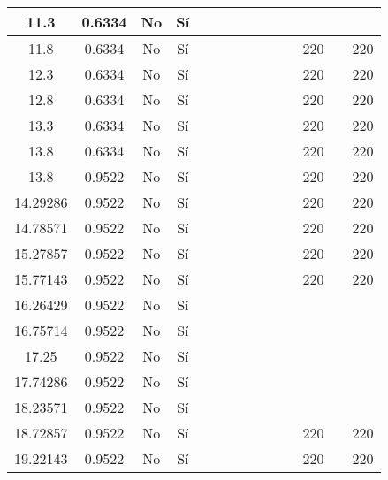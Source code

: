 \begin{table}[H]
{\begin{tabular}{|c|c|c|c|c|c|c|c|c|c|c|c|c|c|}
11.3 & 0.6334 & No  & Sí  &     &     &     &     &     &     &     &     &     &  \bigstrut\\
\hline
11.8 & 0.6334 & No  & Sí  &     &     &     &     &     &     &     & 220 &     & 220 \bigstrut\\
\hline
12.3 & 0.6334 & No  & Sí  &     &     &     &     &     &     &     & 220 &     & 220 \bigstrut\\
\hline
12.8 & 0.6334 & No  & Sí  &     &     &     &     &     &     &     & 220 &     & 220 \bigstrut\\
\hline
13.3 & 0.6334 & No  & Sí  &     &     &     &     &     &     &     & 220 &     & 220 \bigstrut\\
\hline
13.8 & 0.6334 & No  & Sí  &     &     &     &     &     &     &     & 220 &     & 220 \bigstrut\\
\hline
13.8 & 0.9522 & No  & Sí  &     &     &     &     &     &     &     & 220 &     & 220 \bigstrut\\
\hline
14.29286 & 0.9522 & No  & Sí  &     &     &     &     &     &     &     & 220 &     & 220 \bigstrut\\
\hline
14.78571 & 0.9522 & No  & Sí  &     &     &     &     &     &     &     & 220 &     & 220 \bigstrut\\
\hline
15.27857 & 0.9522 & No  & Sí  &     &     &     &     &     &     &     & 220 &     & 220 \bigstrut\\
\hline
15.77143 & 0.9522 & No  & Sí  &     &     &     &     &     &     &     & 220 &     & 220 \bigstrut\\
\hline
16.26429 & 0.9522 & No  & Sí  &     &     &     &     &     &     &     &     &     &  \bigstrut\\
\hline
16.75714 & 0.9522 & No  & Sí  &     &     &     &     &     &     &     &     &     &  \bigstrut\\
\hline
17.25 & 0.9522 & No  & Sí  &     &     &     &     &     &     &     &     &     &  \bigstrut\\
\hline
17.74286 & 0.9522 & No  & Sí  &     &     &     &     &     &     &     &     &     &  \bigstrut\\
\hline
18.23571 & 0.9522 & No  & Sí  &     &     &     &     &     &     &     &     &     &  \bigstrut\\
\hline
18.72857 & 0.9522 & No  & Sí  &     &     &     &     &     &     &     & 220 &     & 220 \bigstrut\\
\hline
19.22143 & 0.9522 & No  & Sí  &     &     &     &     &     &     &     & 220 &     & 220 \bigstrut\\

\end{tabular}}
\end{table}
